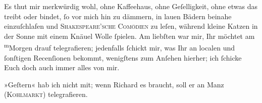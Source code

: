 \pstart
           Es thut mir merkwürdig wohl, ohne Kaffeehaus, ohne Geſelligkeit, ohne etwas das
               treibt oder bindet,{ }ſo vor mich hin zu dämmern, {\pb}in
               lauen Bädern beinahe einzuſchlafen und \textsc{Shakespeare’sche Comödien} zu leſen,
               während kleine Katzen in der Sonne mit einem Knäuel Wolle{ }ſpielen. Am liebſten war
               mir, Ihr möchtet am \substVorne{}\textsuperscript{m}\substDazwischen{}M\substHinten{}orgen drauf telegrafieren; jedenfalls{ }ſchickt mir, was Ihr an  localen und{ }ſonſtigen Recenſionen bekommt,
               wenigſtens zum Anſehen hierher; ich{ }ſchicke Euch doch auch immer alles von mir.\pend
           
\pstart
           »Geſtern« hab ich nicht mit; wenn Richard es
               braucht, soll er an Manz (\textsc{Kohlmarkt}) {\pb}telegrafieren.\pend
           
